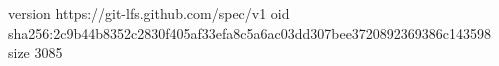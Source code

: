 version https://git-lfs.github.com/spec/v1
oid sha256:2c9b44b8352c2830f405af33efa8c5a6ac03dd307bee3720892369386c143598
size 3085
